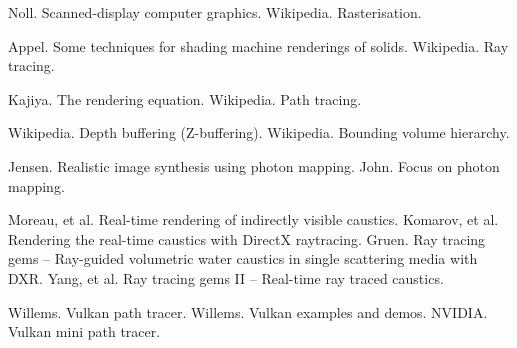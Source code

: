 \documentclass[12pt]{article}
\begin{document}
\pagebreak



\begin{thebibliography}{9}

 Noll. Scanned-display computer graphics.
 Wikipedia. Rasterisation.

 Appel. Some techniques for shading machine renderings of solids.
 Wikipedia. Ray tracing.

 Kajiya. The rendering equation.
 Wikipedia. Path tracing.

 Wikipedia. Depth buffering (Z-buffering).
 Wikipedia. Bounding volume hierarchy.


 Jensen. Realistic image synthesis using photon mapping.
 John. Focus on photon mapping.


 Moreau, et al. Real-time rendering of indirectly visible caustics.
 Komarov, et al. Rendering the real-time caustics with DirectX raytracing.
 Gruen. Ray tracing gems -- Ray-guided volumetric water caustics in single scattering media with DXR.
 Yang, et al. Ray tracing gems II -- Real-time ray traced caustics.






 Willems. Vulkan path tracer.
 Willems. Vulkan examples and demos.
 NVIDIA. Vulkan mini path tracer.



\end{thebibliography}


\pagebreak
\end{document}

